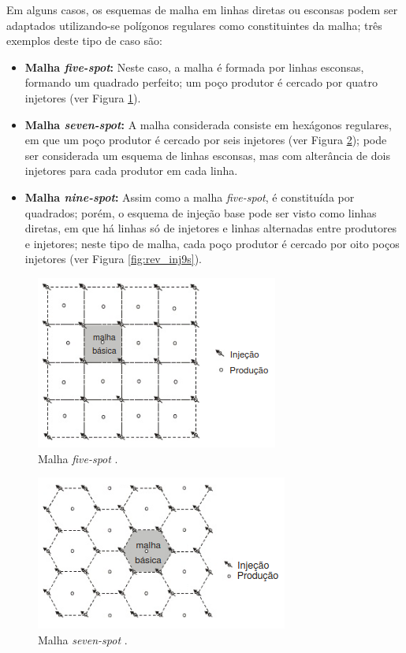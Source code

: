 Em alguns casos, os esquemas de malha em linhas diretas ou esconsas podem ser adaptados utilizando-se polígonos regulares como constituintes da malha; três exemplos deste tipo de caso são:
\begin{itemize}
\item \textbf{Malha \textit{five-spot}:} Neste caso, a malha é formada por linhas esconsas, formando um quadrado perfeito; um poço produtor é cercado por quatro injetores (ver Figura \ref{fig:rev_inj5s}).
\item \textbf{Malha \textit{seven-spot}:} A malha considerada consiste em hexágonos regulares, em que um poço produtor é cercado por seis injetores (ver Figura \ref{fig:rev_inj7s}); pode ser considerada um esquema de linhas esconsas, mas com alterância de dois injetores para cada produtor em cada linha.
\item \textbf{Malha \textit{nine-spot}:} Assim como a malha \textit{five-spot}, é constituída por quadrados; porém, o esquema de injeção base pode ser visto como linhas diretas, em que há linhas só de injetores e linhas alternadas entre produtores e injetores; neste tipo de malha, cada poço produtor é cercado por oito poços injetores (ver Figura \ref{fig:rev_inj9s}).
\end{itemize}

\begin{figure}[!ht]
\centering
\includegraphics[width=.6\textwidth]{figs/revisao/revisao_inj5s.png}
\caption{Malha \textit{five-spot} \cite[p. 568]{engres}.}
\label{fig:rev_inj5s}
\end{figure}

\begin{figure}[!ht]
\centering
\includegraphics[width=.6\textwidth]{figs/revisao/revisao_inj7s.png}
\caption{Malha \textit{seven-spot} \cite[p. 568]{engres}.}
\label{fig:rev_inj7s}
\end{figure}

